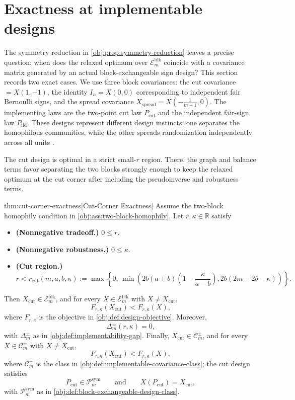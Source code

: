 \section{Exactness at implementable designs}

The symmetry reduction in \cref{obj:prop:symmetry-reduction} leaves a precise question: when does the relaxed optimum over \(\mathcal E_m^{\mathrm{blk}}\) coincide with a covariance matrix generated by an actual block-exchangeable sign design? This section records two exact cases. We use three block covariances: the cut covariance \(=X(1,-1)\), the identity \(I_n=X(0,0)\) corresponding to independent fair Bernoulli signs, and the spread covariance \(X_{\mathrm{spread}}=X\!\left(-\tfrac{1}{m-1},0\right)\). The implementing laws are the two-point cut law \(P_{\mathrm{cut}}\) and the independent fair-sign law \(P_{\mathrm{iid}}\). These designs represent different design instincts: one separates the homophilous communities, while the other spreads randomization independently across all units \citep{efron1971,morgan2012,harshaw2019}.

The cut design is optimal in a strict small-\(r\) region. There, the graph and balance terms favor separating the two blocks strongly enough to keep the relaxed optimum at the cut corner after including the pseudoinverse and robustness terms.

\begin{theoremv}{thm:cut-corner-exactness}[Cut-Corner Exactness]
Assume the two-block homophily condition in \cref{obj:ass:two-block-homophily}. Let \(r,\kappa\in\mathbb R\) satisfy
\begin{itemize}
\item \textbf{(Nonnegative tradeoff.)} \(0\le r\).
\item \textbf{(Nonnegative robustness.)} \(0\le \kappa\).
\item \textbf{(Cut region.)}
\[
r< r_{\mathrm{cut}}(m,a,b,\kappa)
:= \max\!\left\{0,\,
\min\!\left(
2b(a+b)\left(1-\frac{\kappa}{a-b}\right),
2b(2m-2b-\kappa)
\right)\right\}.
\]
\end{itemize}
Then \(X_{\mathrm{cut}}\in\mathcal E_m^{\mathrm{blk}}\), and for every
\(X\in\mathcal E_m^{\mathrm{blk}}\) with \(X\ne X_{\mathrm{cut}}\),
\[
F_{r,\kappa}(X_{\mathrm{cut}})<F_{r,\kappa}(X),
\]
where \(F_{r,\kappa}\) is the objective in \cref{obj:def:design-objective}. Moreover,
\[
\Delta_m^{\pm}(r,\kappa)=0,
\]
with \(\Delta_m^{\pm}\) as in \cref{obj:def:implementability-gap}. Finally,
\(X_{\mathrm{cut}}\in\mathcal C_m^{\pm}\), and for every
\(X\in\mathcal C_m^{\pm}\) with \(X\ne X_{\mathrm{cut}}\),
\[
F_{r,\kappa}(X_{\mathrm{cut}})<F_{r,\kappa}(X),
\]
where \(\mathcal C_m^{\pm}\) is the class in \cref{obj:def:implementable-covariance-class}; the cut design satisfies
\[
P_{\mathrm{cut}}\in\mathcal P_m^{\mathrm{sym}}
\qquad\text{and}\qquad
X(P_{\mathrm{cut}})=X_{\mathrm{cut}},
\]
with \(\mathcal P_m^{\mathrm{sym}}\) as in \cref{obj:def:block-exchangeable-design-class}.
\end{theoremv}

